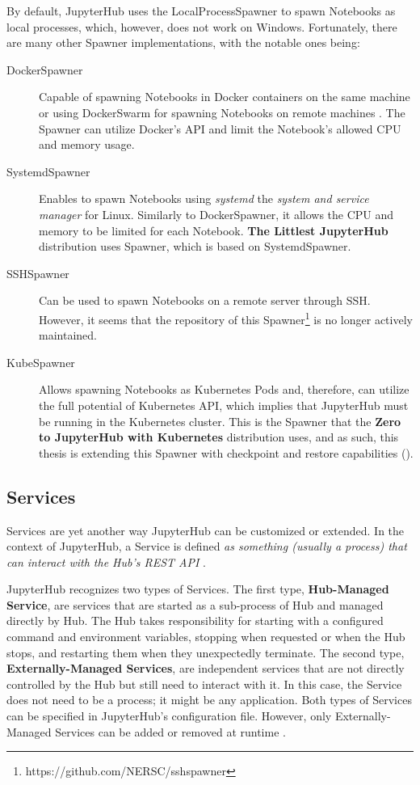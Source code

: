 \documentclass[
  digital,     %
  oneside,     %
  nosansbold,  %
  nocolorbold, %
  lof,         %
  lot,         %
]{fithesis4}
\begin{document}
By default, JupyterHub uses the LocalProcessSpawner to spawn Notebooks as local processes, which, however, does not work on Windows. Fortunately, there are many other Spawner implementations, with the notable ones being:
\begin{description}

    \item[DockerSpawner] Capable of spawning Notebooks in Docker containers on the same machine or using DockerSwarm for spawning Notebooks on remote machines \cite{jupyterhub_spawner}. The Spawner can utilize Docker's API and limit the Notebook's allowed CPU and memory usage.
    
    \item[SystemdSpawner]
    Enables to spawn Notebooks using \emph{systemd} the \emph{system and service manager} \cite{systemd} for Linux. Similarly to DockerSpawner, it allows the CPU and memory to be limited for each Notebook. \textbf{The Littlest JupyterHub} distribution uses Spawner, which is based on SystemdSpawner.

    \item[SSHSpawner]
    Can be used to spawn Notebooks on a remote server through SSH. However, it seems that the repository of this Spawner\footnote{https://github.com/NERSC/sshspawner} is no longer actively maintained.

    \item[KubeSpawner]
    Allows spawning Notebooks as Kubernetes Pods and, therefore, can utilize the full potential of Kubernetes API, which implies that JupyterHub must be running in the Kubernetes cluster. This is the Spawner that the \textbf{Zero to JupyterHub with Kubernetes} distribution uses, and as such, this thesis is extending this Spawner with checkpoint and restore capabilities ().
    
\end{description}


\subsection{Services}
\label{subsec:jupyterhub:services}
Services are yet another way JupyterHub can be customized or extended. In the context of JupyterHub, a Service is defined \emph{as something (usually a process) that can interact with the Hub's REST API} \cite{jupyterhub_service}.

JupyterHub recognizes two types of Services. The first type, \textbf{Hub-Managed Service}, are services that are started as a sub-process of Hub and managed directly by Hub. The Hub takes responsibility for starting with a configured command and environment variables, stopping when requested or when the Hub stops, and restarting them when they unexpectedly terminate. The second type, \textbf{Externally-Managed Services}, are independent services that are not directly controlled by the Hub but still need to interact with it. In this case, the Service does not need to be a process; it might be any application. Both types of Services can be specified in JupyterHub's configuration file. However, only Externally-Managed Services can be added or removed at runtime \cite{jupyterhub_service}.
\end{document}
